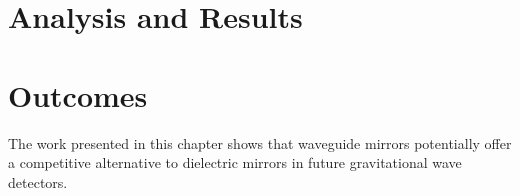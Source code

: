 \section{Analysis and Results}

\section{Outcomes}

The work presented in this chapter shows that waveguide mirrors potentially offer a competitive alternative to dielectric mirrors in future gravitational wave detectors.

